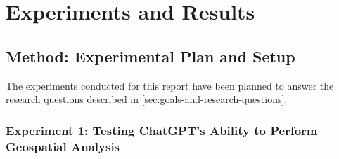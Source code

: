 \chapter{Experiments and Results}
\label{cha:experiments}

\section{Method: Experimental Plan and Setup}
\label{sec:experimental-plan-and-setup}

The experiments conducted for this report have been planned to answer the research questions described in \autoref{sec:goals-and-research-questions}.

\subsection{Experiment 1: Testing ChatGPT's Ability to Perform Geospatial Analysis}

